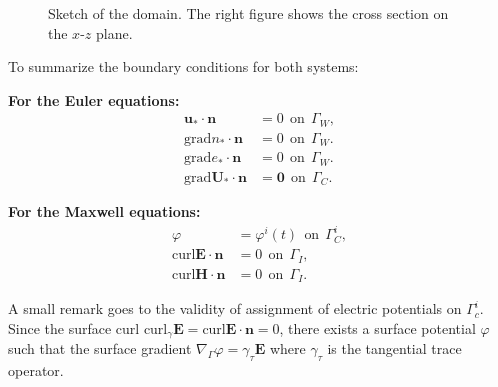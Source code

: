 \documentclass{article}
\begin{document}
\begin{figure}
\begin{minipage}{0.49\textwidth}
{}
\end{minipage}
\caption{Sketch of the domain. The right figure shows the cross section on the $x$-$z$ plane.}
\end{figure}


    To summarize the boundary conditions for both systems:
    
\vspace{10pt}
\begin{minipage}[t]{0.49\textwidth}
    \textbf{For the Euler equations:}
    \begin{align*}
    \mathbf{u_*}\cdot \mathbf{n} &= 0 \ \ \text{on} \ \ \Gamma_W, \\
    \text{grad}n_* \cdot \mathbf{n} &= 0 \ \ \text{on} \ \ \Gamma_W. \\
    \text{grad}e_* \cdot \mathbf{n} &= 0 \ \ \text{on} \ \ \Gamma_W. \\
    \text{grad}\mathbf{U_*} \cdot \mathbf{n} &= \mathbf{0} \ \ \text{on} \ \ \Gamma_C.
\end{align*}
\end{minipage}
\begin{minipage}[t]{0.49\textwidth}
    \textbf{For the Maxwell equations:}
    \begin{align*}
    \varphi &= \varphi^i(t)\ \ \text{on} \ \ \Gamma_C^i, \\
    \text{curl} \mathbf{E} \cdot \mathbf{n} &= 0\ \ \text{on} \ \  \Gamma_I,  \\
    \text{curl} \mathbf{H} \cdot \mathbf{n} &= 0\ \  \text{on} \ \  \Gamma_I.\
    \end{align*}
\end{minipage}

\vspace{10pt}
A small remark goes to the validity of assignment of electric potentials on $\Gamma_c^i$. Since the surface curl $\text{curl}_\gamma\mathbf{E} = \text{curl} \mathbf{E} \cdot \mathbf{n} = 0$, there exists a surface potential $\varphi$ such that the surface gradient $\nabla_\Gamma \varphi = \gamma_\tau \mathbf{E}$ where $\gamma_\tau $ is the tangential trace operator. 
\end{document}
